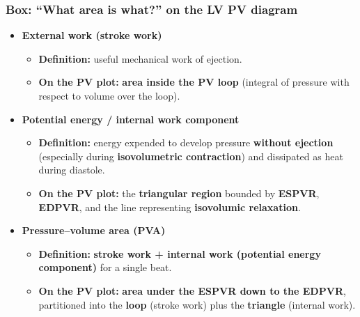 \documentclass[11pt,a4paper]{article}
\begin{document}
\subsubsection{Box: ``What area is what?'' on the LV PV diagram}
\begin{itemize}
\item \textbf{External work (stroke work)}
  \begin{itemize}
  \item \textbf{Definition:} useful mechanical work of ejection.
  \item \textbf{On the PV plot:} \textbf{area inside the PV loop} (integral of pressure with respect to volume over the loop).
  \end{itemize}
\item \textbf{Potential energy / internal work component}
  \begin{itemize}
  \item \textbf{Definition:} energy expended to develop pressure \textbf{without ejection} (especially during \textbf{isovolumetric contraction}) and dissipated as heat during diastole.
  \item \textbf{On the PV plot:} the \textbf{triangular region} bounded by \textbf{ESPVR}, \textbf{EDPVR}, and the line representing \textbf{isovolumic relaxation}.
  \end{itemize}
\item \textbf{Pressure--volume area (PVA)}
  \begin{itemize}
  \item \textbf{Definition:} \textbf{stroke work + internal work (potential energy component)} for a single beat.
  \item \textbf{On the PV plot:} \textbf{area under the ESPVR down to the EDPVR}, partitioned into the \textbf{loop} (stroke work) plus the \textbf{triangle} (internal work).
  \end{itemize}
\end{itemize}
\end{document}
